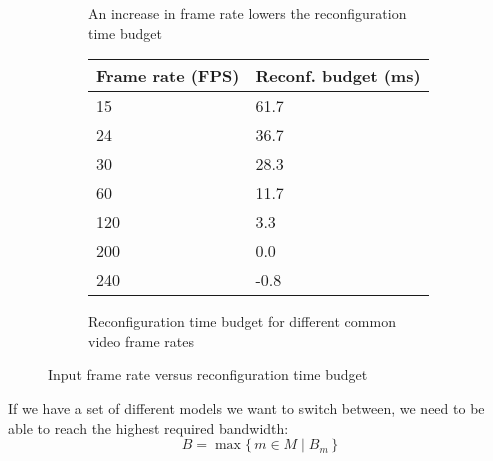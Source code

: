 \begin{figure}[htbp]
    \centering
    \begin{subfigure}[b]{0.48\textwidth}
        \begin{adjustbox}{width=\linewidth}
        
        \end{adjustbox}
        \caption{An increase in frame rate lowers the reconfiguration time budget}
        \label{}
    \end{subfigure}
    \hfill
    \begin{subfigure}[b]{0.48\textwidth}
        \begin{tabular}{@{}ll@{}}
        \toprule
        Frame rate (FPS) & Reconf. budget (ms) \\ \midrule
        15               & 61.7                \\
        24               & 36.7                \\
        30               & 28.3                \\
        60               & 11.7                \\
        120              & 3.3                 \\
        200              & 0.0                 \\
        240              & -0.8                \\ \bottomrule
        \end{tabular}
        \caption{Reconfiguration time budget for different common video frame rates}
        \label{tab:common_fps}
    \end{subfigure}
    \caption[]{Input frame rate versus reconfiguration time budget}
    \label{fig:frame_rate_versus_time_budget}
\end{figure}

If we have a set of different models we want to switch between, we need to be able to reach the highest required bandwidth:
\begin{equation*}
    B = \max\{\,m \in M \mid B_m \,\} 
\end{equation*}